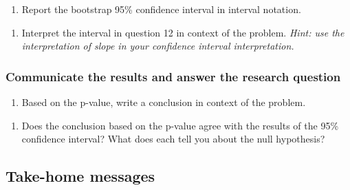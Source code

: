 \documentclass[
]{report}
\providecommand{\tightlist}{%
  \setlength{\itemsep}{0pt}\setlength{\parskip}{0pt}}
\begin{document}
\begin{enumerate}
\def\labelenumi{\arabic{enumi}.}
\setcounter{enumi}{11}
\tightlist
\item
  Report the bootstrap 95\% confidence interval in interval notation.
\end{enumerate}

\vspace{0.5in}

\begin{enumerate}
\def\labelenumi{\arabic{enumi}.}
\setcounter{enumi}{12}
\tightlist
\item
  Interpret the interval in question 12 in context of the problem. \emph{Hint: use the interpretation of slope in your confidence interval interpretation.}
\end{enumerate}

\vspace{0.8in}

\hypertarget{communicate-the-results-and-answer-the-research-question-4}{%
\subsubsection*{Communicate the results and answer the research question}\label{communicate-the-results-and-answer-the-research-question-4}}

\begin{enumerate}
\def\labelenumi{\arabic{enumi}.}
\setcounter{enumi}{13}
\tightlist
\item
  Based on the p-value, write a conclusion in context of the problem.
\end{enumerate}

\vspace{.8in}

\begin{enumerate}
\def\labelenumi{\arabic{enumi}.}
\setcounter{enumi}{14}
\tightlist
\item
  Does the conclusion based on the p-value agree with the results of the 95\% confidence interval? What does each tell you about the null hypothesis?
\end{enumerate}

\vspace{.6in}

\newpage

\hypertarget{take-home-messages-22}{%
\subsection{Take-home messages}\label{take-home-messages-22}}
\end{document}
